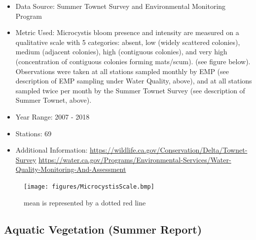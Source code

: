 \documentclass[
]{book}
\providecommand{\tightlist}{%
  \setlength{\itemsep}{0pt}\setlength{\parskip}{0pt}}
\begin{document}
\begin{itemize}
\tightlist
\item
  Data Source: Summer Townet Survey and Environmental Monitoring Program
\item
  Metric Used: Microcystis bloom presence and intensity are measured on a qualitative scale with 5 categories: absent, low (widely scattered colonies), medium (adjacent colonies), high (contiguous colonies), and very high (concentration of contiguous colonies forming mats/scum). (see figure below). Observations were taken at all stations sampled monthly by EMP (see description of EMP sampling under Water Quality, above), and at all stations sampled twice per month by the Summer Townet Survey (see description of Summer Townet, above).
\item
  Year Range: 2007 - 2018
\item
  Stations: 69
\item
  Additional Information: \url{https://wildlife.ca.gov/Conservation/Delta/Townet-Survey} \url{https://water.ca.gov/Programs/Environmental-Services/Water-Quality-Monitoring-And-Assessment}
\end{itemize}

\begin{figure}
\centering
\texttt{[image: figures/MicrocystisScale.bmp]}
\caption{\label{fig:unnamed-chunk-187}mean is represented by a dotted red line}
\end{figure}

\hypertarget{aquatic-vegetation-summer-report}{%
\subsection{Aquatic Vegetation (Summer Report)}\label{aquatic-vegetation-summer-report}}
\end{document}
